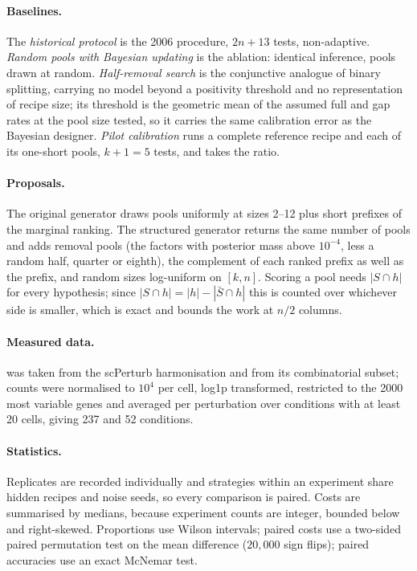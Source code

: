 \documentclass[10pt]{article}
\begin{document}
\paragraph{Baselines.} The \emph{historical protocol} is the 2006 procedure,
$2n+13$ tests, non-adaptive. \emph{Random pools with Bayesian updating} is the
ablation: identical inference, pools drawn at random. \emph{Half-removal
search} is the conjunctive analogue of binary splitting, carrying no model
beyond a positivity threshold and no representation of recipe size; its
threshold is the geometric mean of the assumed full and gap rates at the pool
size tested, so it carries the same calibration error as the Bayesian
designer. \emph{Pilot calibration} runs a complete reference recipe and each of
its one-short pools, $k+1 = 5$ tests, and takes the ratio.

\paragraph{Proposals.} The original generator draws pools uniformly at sizes
2--12 plus short prefixes of the marginal ranking. The structured generator
returns the same number of pools and adds removal pools (the factors with
posterior mass above $10^{-4}$, less a random half, quarter or eighth), the
complement of each ranked prefix as well as the prefix, and random sizes
log-uniform on $[k, n]$. Scoring a pool needs $|S \cap h|$ for every
hypothesis; since $|S\cap h| = |h| - |\bar S \cap h|$ this is counted over
whichever side is smaller, which is exact and bounds the work at $n/2$ columns.

\paragraph{Measured data.} \citet{norman2019} was taken from the scPerturb
harmonisation \citep{peidli2024} and \citet{joung2023} from its combinatorial
subset; counts were normalised to $10^4$ per cell, log1p transformed,
restricted to the 2000 most variable genes and averaged per perturbation over
conditions with at least 20 cells, giving 237 and 52 conditions.

\paragraph{Statistics.} Replicates are recorded individually and strategies
within an experiment share hidden recipes and noise seeds, so every comparison
is paired. Costs are summarised by medians, because experiment counts are
integer, bounded below and right-skewed. Proportions use Wilson intervals;
paired costs use a two-sided paired permutation test on the mean difference
($20{,}000$ sign flips); paired accuracies use an exact McNemar test.
\end{document}
